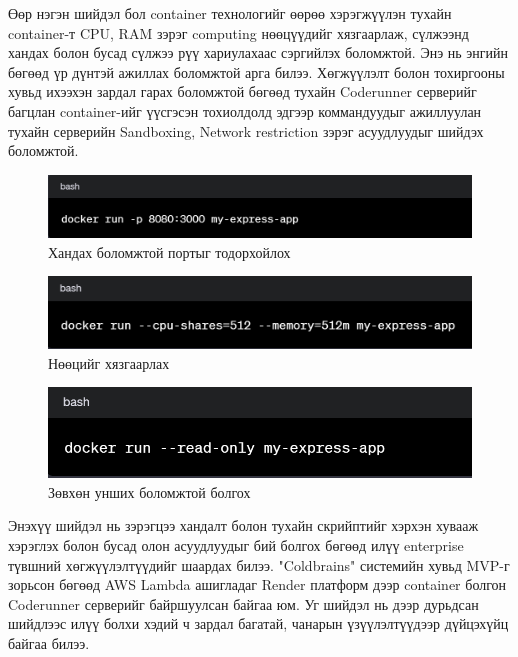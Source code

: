 Өөр нэгэн шийдэл бол container технологийг өөрөө хэрэгжүүлэн тухайн container-т CPU, RAM зэрэг computing нөөцүүдийг хязгаарлаж, сүлжээнд хандах болон бусад сүлжээ рүү хариулахаас сэргийлэх боломжтой. Энэ нь энгийн бөгөөд үр дүнтэй ажиллах боломжтой арга билээ. Хөгжүүлэлт болон тохиргооны хувьд ихээхэн зардал гарах боломжтой бөгөөд тухайн Coderunner серверийг багцлан container-ийг үүсгэсэн тохиолдолд
эдгээр коммандуудыг ажиллуулан тухайн серверийн Sandboxing, Network restriction зэрэг асуудлуудыг шийдэх боломжтой.

\begin{figure}[H]
  \centering
  \includegraphics[width=12cm]{img/docker-port.PNG}
  \caption{Хандах боломжтой портыг тодорхойлох}
\end{figure}

\begin{figure}[H]
  \centering
  \includegraphics[width=12cm]{img/docker-resource.PNG}
  \caption{Нөөцийг хязгаарлах}
\end{figure}

\begin{figure}[H]
  \centering
  \includegraphics[width=12cm]{img/docker-readonly.PNG}
  \caption{Зөвхөн унших боломжтой болгох}
\end{figure}

Энэхүү шийдэл нь зэрэгцээ хандалт болон тухайн скрийптийг хэрхэн хувааж хэрэглэх болон бусад олон асуудлуудыг бий болгох бөгөөд илүү enterprise түвшний хөгжүүлэлтүүдийг шаардах билээ.
"Coldbrains" системийн хувьд MVP-г зорьсон бөгөөд AWS Lambda ашигладаг Render платформ дээр container болгон Coderunner серверийг байршуулсан байгаа юм. Уг шийдэл нь дээр дурьдсан шийдлээс илүү болхи хэдий ч зардал багатай, чанарын үзүүлэлтүүдээр дүйцэхүйц байгаа билээ.

